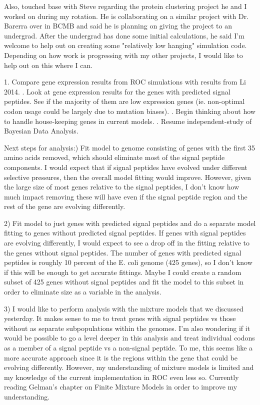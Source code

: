 \documentclass[11pt]{labbook}
\begin{document}
Also, touched base with Steve regarding the protein clustering project he and I worked on during my rotation. He is collaborating on a similar project with Dr. Barerra over in BCMB and said he is planning on giving the project to an undergrad. After the undergrad has done some initial calculations, he said I'm welcome to help out on creating some "relatively low hanging" simulation code. Depending on how work is progressing with my other projects, I would like to help out on this where I can. 

1. Compare gene expression results from ROC simulations with results from Li 2014.
. Look at gene expression results for the genes with predicted signal peptides. See if the majority of them are low expression genes (ie. non-optimal codon usage could be largely due to mutation biases).
. Begin thinking about how to handle house-keeping genes in current models.
. Resume independent-study of Bayesian Data Analysis.


Next steps for analysis:) Fit model to genome consisting of genes with the first 35 amino acids removed, which should eliminate most of the signal peptide components. I would expect that if signal peptides have evolved under different selective pressures, then the overall model fitting would improve. However, given the large size of most genes relative to the signal peptides, I don't know how much impact removing these will have even if the signal peptide region and the rest of the gene are evolving differently. 

2) Fit model to just genes with predicted signal peptides and do a separate model fitting to genes without predicted signal peptides. If genes with signal peptides are evolving differently, I would expect to see a drop off in the fitting relative to the genes without signal peptides. The number of genes with predicted signal peptides is roughly 10 percent of the E. coli genome (425 genes), so I don't know if this will be enough to get accurate fittings. Maybe I could create a random subset of 425 genes without signal peptides and fit the model to this subset in order to eliminate size as a variable in the analysis.

3) I would like to perform analysis with the mixture models that we discussed yesterday. It makes sense to me to treat genes with signal peptides vs those without as separate subpopulations within the genomes. I'm also wondering if it would be possible to go a level deeper in this analysis and treat individual codons as a member of a signal peptide vs a non-signal peptide. To me, this seems like a more accurate approach since it is the regions within the gene that could be evolving differently. However, my understanding of mixture models is limited and my knowledge of the current implementation in ROC even less so. Currently reading Gelman's chapter on Finite Mixture Models in order to improve my understanding. 
\end{document}
